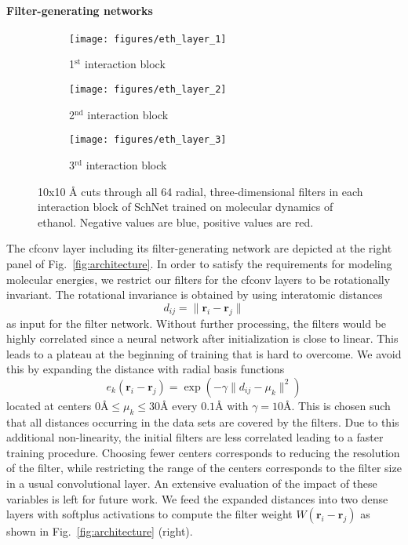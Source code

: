 \documentclass{article}
\newcommand{\rr}{\mathbf{r}}
\begin{document}
\paragraph{Filter-generating networks}
\begin{figure}
\centering
\begin{subfigure}[b]{0.28\textwidth}
  \texttt{[image: figures/eth\_layer\_1]}
  \caption{1$^\text{st}$ interaction block}
  \label{fig:layer1}
\end{subfigure}
\quad
\begin{subfigure}[b]{0.28\textwidth}
  \texttt{[image: figures/eth\_layer\_2]}
  \caption{2$^\text{nd}$ interaction block}
  \label{fig:layer1}
\end{subfigure}
\quad
\begin{subfigure}[b]{0.28\textwidth}
  \texttt{[image: figures/eth\_layer\_3]}
  \caption{3$^\text{rd}$ interaction block}
  \label{fig:layer1}
\end{subfigure}
\caption{10x10 {\AA} cuts through all 64 radial, three-dimensional filters in each interaction block of
SchNet trained on molecular dynamics of ethanol. Negative values are blue, positive values are red.}\label{fig:filters}
\end{figure}
The cfconv layer including its filter-generating network are depicted at the right panel of Fig.~\ref{fig:architecture}.
In order to satisfy the requirements for modeling molecular energies, we restrict our filters for the cfconv layers to be rotationally invariant.
The rotational invariance is obtained by using interatomic distances
\[
d_{ij} = \| \rr_i-\rr_j\|
\]
as input for the filter network.
Without further processing, the filters would be highly correlated since a neural network after initialization is close to linear.
This leads to a plateau at the beginning of training that is hard to overcome.
We avoid this by expanding the distance with radial basis functions 
\[
e_k(\rr_i-\rr_j) = \exp ( -\gamma \|d_{ij} - \mu_k \|^2 )
\]
located at centers $0\text{\AA} \leq \mu_k \leq 30\text{\AA}$ every $0.1${\AA} with $\gamma=10${\AA}.
This is chosen such that all distances occurring in the data sets are covered by the filters.
Due to this additional non-linearity, the initial filters are less correlated leading to a faster training procedure.
Choosing fewer centers corresponds to reducing the resolution of the filter, while restricting the range of the centers corresponds to the filter size in a usual convolutional layer.
An extensive evaluation of the impact of these variables is left for future work.
We feed the expanded distances 
into two dense layers with softplus activations to compute the filter weight $W(\rr_i - \rr_j)$ as shown in Fig.~\ref{fig:architecture} (right).
\end{document}
